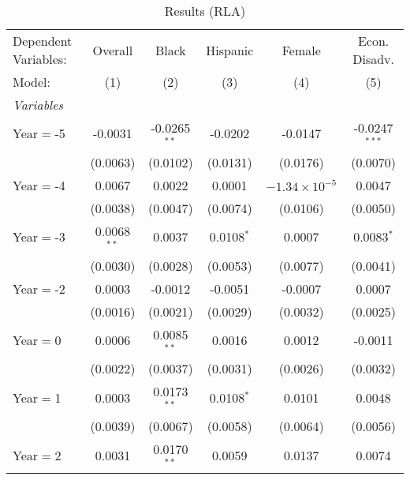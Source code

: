 
\begin{table}[htbp]
   \centering
   \caption{\label{MainResultsRLA} Results (RLA)}
   \begin{tabular}{lccccc}
      \tabularnewline\midrule\midrule
      Dependent Variables: & Overall       & Black          & Hispanic     & Female                 & Econ. Disadv.\\
      Model:               & (1)           & (2)            & (3)          & (4)                    & (5)\\
      \midrule \emph{Variables} &   &   &   &   &  \\
      Year$=$-5            & -0.0031       & -0.0265$^{**}$ & -0.0202      & -0.0147                & -0.0247$^{***}$\\
                           & (0.0063)      & (0.0102)       & (0.0131)     & (0.0176)               & (0.0070)\\
      Year$=$-4            & 0.0067        & 0.0022         & 0.0001       & $-1.34\times 10^{-5}$ & 0.0047\\
                           & (0.0038)      & (0.0047)       & (0.0074)     & (0.0106)               & (0.0050)\\
      Year$=$-3            & 0.0068$^{**}$ & 0.0037         & 0.0108$^{*}$ & 0.0007                 & 0.0083$^{*}$\\
                           & (0.0030)      & (0.0028)       & (0.0053)     & (0.0077)               & (0.0041)\\
      Year$=$-2            & 0.0003        & -0.0012        & -0.0051      & -0.0007                & 0.0007\\
                           & (0.0016)      & (0.0021)       & (0.0029)     & (0.0032)               & (0.0025)\\
      Year$=$0             & 0.0006        & 0.0085$^{**}$  & 0.0016       & 0.0012                 & -0.0011\\
                           & (0.0022)      & (0.0037)       & (0.0031)     & (0.0026)               & (0.0032)\\
      Year$=$1             & 0.0003        & 0.0173$^{**}$  & 0.0108$^{*}$ & 0.0101                 & 0.0048\\
                           & (0.0039)      & (0.0067)       & (0.0058)     & (0.0064)               & (0.0056)\\
      Year$=$2             & 0.0031        & 0.0170$^{**}$  & 0.0059       & 0.0137                 & 0.0074\\

\end{tabular}
\end{table}
